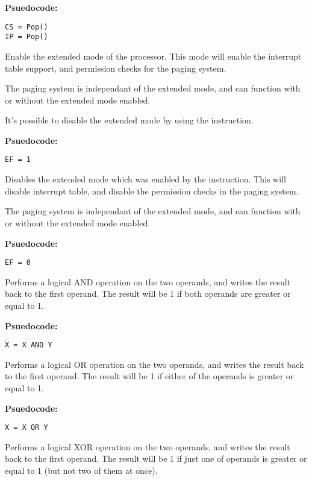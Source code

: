 \textbf{Psuedocode:}
\begin{verbatim}
CS = Pop()
IP = Pop()
\end{verbatim}

Enable the extended mode of the processor. This mode will enable the interrupt table support, and permission checks for the paging system.

The paging system is independant of the extended mode, and can function with or without the extended mode enabled.

It's possible to disable the extended mode by using the  instruction.

\intrpriv

\textbf{Psuedocode:}
\begin{verbatim}
EF = 1
\end{verbatim}


Disables the extended mode which was enabled by the  instruction. This will disable interrupt table, and disable the permission checks in the paging system.

The paging system is independant of the extended mode, and can function with or without the extended mode enabled.

\intrpriv

\textbf{Psuedocode:}
\begin{verbatim}
EF = 0
\end{verbatim}


Performs a logical AND operation on the two operands, and writes the result back to the first operand. The result will be 1 if both operands are greater or equal to 1.

\textbf{Psuedocode:}
\begin{verbatim}
X = X AND Y
\end{verbatim}


Performs a logical OR operation on the two operands, and writes the result back to the first operand. The result will be 1 if either of the operands is greater or equal to 1.

\textbf{Psuedocode:}
\begin{verbatim}
X = X OR Y
\end{verbatim}


Performs a logical XOR operation on the two operands, and writes the result back to the first operand. The result will be 1 if just one of operands is greater or equal to 1 (but not two of them at once).

